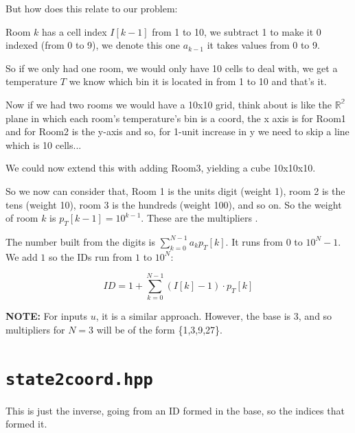 \documentclass[11pt,a4paper]{article}
\begin{document}
But how does this relate to our problem:

Room $k$ has a cell index $I[k-1]$ from 1 to 10, we subtract 1 to make it 0 indexed (from 0 to 9), we denote this one $a_{k-1}$ it takes values from 0 to 9.

So if we only had one room, we would only have 10 cells to deal with, we get a temperature $T$ we know which bin it is located in from 1 to 10 and that's it.

Now if we had two rooms we would have a 10x10 grid, think about is like the $\mathbb{R^2}$ plane in which each room's temperature's bin is a coord, the x axis is for Room1 and for Room2 is the y-axis and so, for 1-unit increase in y we need to skip a line which is 10 cells...

We could now extend this with adding Room3, yielding a cube 10x10x10.

So we now can consider that, Room 1 is the units digit (weight 1), room 2 is the tens (weight 10), room 3 is the hundreds (weight 100), and so on.
So the weight of room $k$ is $p_T[k-1] = 10^{k-1}$. These are the multipliers .

The number built from the digits is $\sum_{k=0}^{N-1} a_k  p_T[k]$. It runs from $0$ to $10^N - 1$. We add $1$ so the IDs run from $1$ to $10^N$:

\[
ID = 1 + \sum_{k=0}^{N-1} (I[k]-1) \cdot p_T[k]
\]

\textbf{NOTE:} For inputs $u$, it is a similar approach. However, the base is 3, and so multipliers for $N=3$ will be of the form \{1,3,9,27\}.

\section{\texttt{state2coord.hpp}}
This is just the inverse, going from an ID formed in the base, so the indices that formed it.
\end{document}
